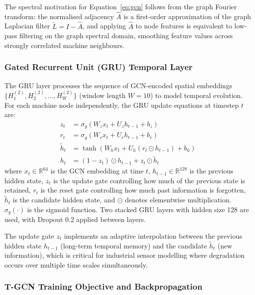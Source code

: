 The spectral motivation for Equation~\ref{eq:gcn} follows from the graph Fourier transform: the normalised adjacency $\hat{A}$ is a first-order approximation of the graph Laplacian filter $\tilde{L} = I - \hat{A}$, and applying $\hat{A}$ to node features is equivalent to low-pass filtering on the graph spectral domain, smoothing feature values across strongly correlated machine neighbours.

\subsubsection{Gated Recurrent Unit (GRU) Temporal Layer}

The GRU layer processes the sequence of GCN-encoded spatial embeddings $\{H^{(2)}_1, H^{(2)}_2, \ldots, H^{(2)}_W\}$ (window length $W = 10$) to model temporal evolution. For each machine node independently, the GRU update equations at timestep $t$ are:
\begin{align}
    z_t &= \sigma_g\!\left(W_z x_t + U_z h_{t-1} + b_z\right)  \label{eq:gru_update} \\
    r_t &= \sigma_g\!\left(W_r x_t + U_r h_{t-1} + b_r\right)  \label{eq:gru_reset} \\
    \tilde{h}_t &= \tanh\!\left(W_h x_t + U_h (r_t \odot h_{t-1}) + b_h\right)  \label{eq:gru_candidate} \\
    h_t &= (1 - z_t) \odot h_{t-1} + z_t \odot \tilde{h}_t  \label{eq:gru_hidden}
\end{align}
where $x_t \in \mathbb{R}^{64}$ is the GCN embedding at time $t$, $h_{t-1} \in \mathbb{R}^{128}$ is the previous hidden state, $z_t$ is the update gate controlling how much of the previous state is retained, $r_t$ is the reset gate controlling how much past information is forgotten, $\tilde{h}_t$ is the candidate hidden state, and $\odot$ denotes elementwise multiplication. $\sigma_g(\cdot)$ is the sigmoid function. Two stacked GRU layers with hidden size 128 are used, with Dropout 0.2 applied between layers.

The update gate $z_t$ implements an adaptive interpolation between the previous hidden state $h_{t-1}$ (long-term temporal memory) and the candidate $\tilde{h}_t$ (new information), which is critical for industrial sensor modelling where degradation occurs over multiple time scales simultaneously.

\subsubsection{T-GCN Training Objective and Backpropagation}

